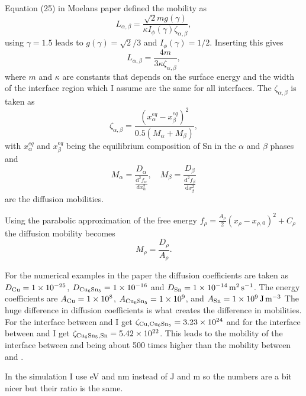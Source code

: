 \documentclass[10pt,a4paper,notitlepage]{article}
\providecommand{\secdiff}[2]{\frac{\mathrm{d}^2#1}{\mathrm{d}#2^2}}
\begin{document}
Equation (25) in Moelans paper \cite{moelans2011quantitative} defined the mobility as
\begin{equation}
  L_{\alpha,\beta} = \frac{\sqrt{2}mg(\gamma)}{\kappa I_\phi(\gamma)\zeta_{\alpha,\beta}},
\end{equation}
using $\gamma=1.5$ leads to $g(\gamma)=\sqrt{2}/3$ and $I_\phi(\gamma)=1/2$.
Inserting this gives
\begin{equation}
  L_{\alpha,\beta} = \frac{4m}{3\kappa\zeta_{\alpha,\beta}},
\end{equation}
where $m$ and $\kappa$ are constants that depends on the surface energy and the width of the interface region which I assume are the same for all interfaces.
The $\zeta_{\alpha,\beta}$ is taken as
\begin{equation}
  \zeta_{\alpha,\beta} = \frac{(x_\alpha^{eq}-x_\beta^{eq})^2}{0.5(M_\alpha+M_\beta)},
\end{equation}
with $x_\alpha^{eq}$ and $x_\beta^{eq}$ being the equilibrium composition of Sn in the $\alpha$ and $\beta$ phases and
\begin{equation}
  M_\alpha = \frac{D_\alpha}{\secdiff{f_\alpha}{x_\alpha}}, \quad   M_\beta = \frac{D_\beta}{\secdiff{f_\beta}{x_\beta}}
\end{equation}
are the diffusion mobilities.

Using the parabolic approximation of the free energy $f_\rho=\frac{A_\rho}{2}(x_\rho-x_{\rho,0})^2+C_\rho$ the diffusion mobility becomes
\begin{equation}
  M_\rho = \frac{D_\rho}{A_\rho}.
\end{equation}

For the numerical examples in the paper the diffusion coefficients are taken as $D_{\ce{Cu}}=\num{1e-25}$, $D_{\ce{Cu6Sn5}}=\num{1e-16}$ and $D_{\ce{Sn}}=\SI{1e-14}{\square\meter\per\second}$.
The energy coefficients are $A_{\ce{Cu}} =\num{1e8}$, $A_{\ce{Cu6Sn5}}=\num{1e9}$, and $A_{\ce{Sn}}=\SI{1e9}{\joule\per\cubic\meter}$
The huge difference in diffusion coefficients is what creates the difference in mobilities.
For the interface between  and  I get $\zeta_{\ce{Cu},\ce{Cu6Sn5}}=\num{3.23e24}$ and for the interface between  and  I get $\zeta_{\ce{Cu6Sn5},\ce{Sn}}=\num{5.42e22}$.
This leads to the mobility of the interface between  and  being about 500 times higher than the mobility between  and .

In the simulation I use \si{\electronvolt} and \si{\nano\meter} instead of \si{\joule} and \si{\meter} so the numbers are a bit nicer but their ratio is the same.


\end{document}
